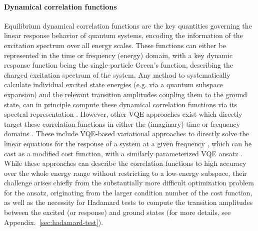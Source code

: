 \paragraph{Dynamical correlation functions}
Equilibrium dynamical correlation functions are the key quantities governing the linear response behavior of quantum systems, encoding the information of the excitation spectrum over all energy scales. These functions can either be represented in the time or frequency (energy) domain, with a key dynamic response function being the single-particle Green's function, describing the charged excitation spectrum of the system. Any method to systematically calculate individual excited state energies (e.g. via a quantum subspace expansion) and the relevant transition amplitudes coupling them to the ground state, can in principle compute these dynamical correlation functions via its spectral representation \cite{Endo2019GF,runggerDynamicalMeanField2020,zhuCalculatingGreenFunction2021,Jamet2021,Jamet2022}. However,  other VQE approaches exist which directly target these correlation functions in either the (imaginary) time or frequency domains \cite{Endo2019GF,sunQuantumComputationFiniteTemperature2021, Wecker2015_Solving}. These include VQE-based variational approaches to directly solve the linear equations for the response of a system at a given frequency \cite{xuVariationalAlgorithmsLinear2021}, which can be cast as a modified cost function, with a similarly parameterized VQE ansatz \cite{Chen2021,caiQuantumComputationMolecular2020, Tong2021}. While these approaches can describe the correlation functions to high accuracy over the whole energy range without restricting to a low-energy subspace, their challenge arises chiefly from the substantially more difficult optimization problem for the ansatz, originating from the larger condition number of the cost function, as well as the necessity for Hadamard tests to compute the transition amplitudes between the excited (or response) and ground states (for more details, see Appendix.~\ref{sec:hadamard-test}).

